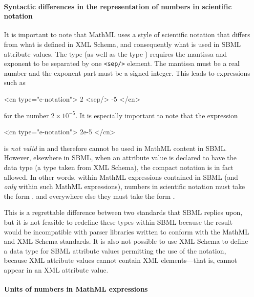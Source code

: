 \paragraph{Syntactic differences in the representation of numbers
  in scientific notation}

It is important to note that MathML uses a style of scientific
notation that differs from what is defined in XML Schema, and
consequently what is used in SBML attribute values.  The
\mathmltwo type 
(as well as the type )
requires the mantissa and
exponent to be separated by one \texttt{<sep/>} element.  The
mantissa must be a real number and the exponent part must be a
signed integer.  This leads to expressions such as

\begin{example}
<cn type="e-notation"> 2 <sep/> -5 </cn>
\end{example}

for the number $2 \times 10^{-5}$.  It is especially
important to note that the expression

\begin{example}
<cn type="e-notation"> 2e-5 </cn>
\end{example}

is \emph{not valid} in \mathmltwo and therefore cannot be used in
MathML content in SBML.  However, elsewhere in SBML, when an
attribute value is declared to have the data type
 (a type taken from XML Schema), the compact
notation  is in fact allowed.  In other words, within
MathML expressions contained in SBML (and \emph{only} within such
MathML expressions), numbers in scientific notation must take the
form , and
everywhere else they must take the form .

This is a regrettable difference between two standards that SBML
replies upon, but it is not feasible to redefine these types
within SBML because the result would be incompatible with parser
libraries written to conform with the MathML and XML Schema
standards.  It is also not possible to use XML Schema to define a
data type for SBML attribute values permitting the use of the
 notation, because XML attribute values cannot
contain XML elements---that is,  cannot appear in an
XML attribute value.


\paragraph{Units of numbers in MathML  expressions}
\label{sec:units-of-mathml}

